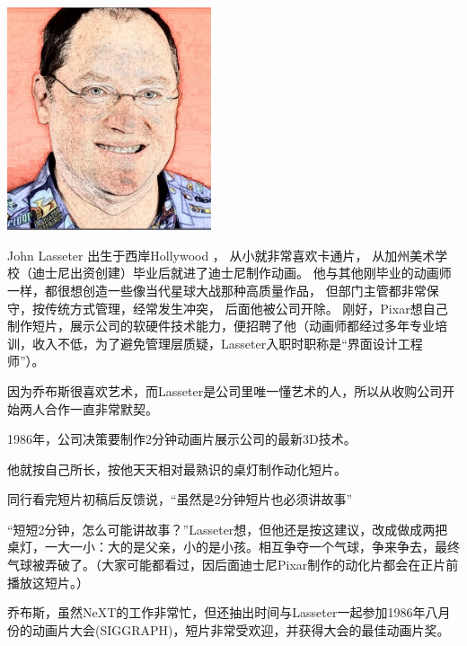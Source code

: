 
\includegraphics[width=6cm]{lasseter2Screenshot_2023-07-28_085441_副本.jpg}

John Lasseter 出生于西岸Hollywood ， 从小就非常喜欢卡通片，
从加州美术学校（迪士尼出资创建）毕业后就进了迪士尼制作动画。
他与其他刚毕业的动画师一样，都很想创造一些像当代星球大战那种高质量作品，
但部门主管都非常保守，按传统方式管理，经常发生冲突， 后面他被公司开除。
刚好，Pixar想自己制作短片，展示公司的软硬件技术能力，便招聘了他（动画师都经过多年专业培训，收入不低，为了避免管理层质疑，Lasseter入职时职称是``界面设计工程师''）。

因为乔布斯很喜欢艺术，而Lasseter是公司里唯一懂艺术的人，所以从收购公司开始两人合作一直非常默契。

1986年，公司决策要制作2分钟动画片展示公司的最新3D技术。

他就按自己所长，按他天天相对最熟识的桌灯制作动化短片。

同行看完短片初稿后反馈说，``虽然是2分钟短片也必须讲故事''

``短短2分钟，怎么可能讲故事？''Lasseter想，但他还是按这建议，改成做成两把桌灯，一大一小：大的是父亲，小的是小孩。相互争夺一个气球，争来争去，最终气球被弄破了。（大家可能都看过，因后面迪士尼Pixar制作的动化片都会在正片前播放这短片。）

乔布斯，虽然NeXT的工作非常忙，但还抽出时间与Lasseter一起参加1986年八月份的动画片大会(SIGGRAPH)，短片非常受欢迎，并获得大会的最佳动画片奖。


